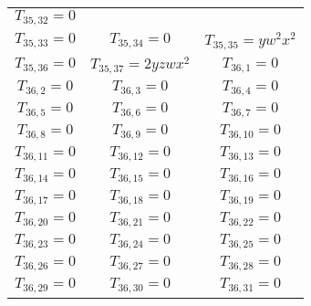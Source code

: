 \begin{longtable}{|c|c|c|}
$T_{35,32}= 0$\\

$T_{35,33}= 0$&

$T_{35,34}= 0$&

$T_{35,35}= yw^2x^2$\\

$T_{35,36}= 0$&

$T_{35,37}= 2yzwx^2$&

$T_{36,1}= 0$\\

$T_{36,2}= 0$&

$T_{36,3}= 0$&

$T_{36,4}= 0$\\

$T_{36,5}= 0$&

$T_{36,6}= 0$&

$T_{36,7}= 0$\\

$T_{36,8}= 0$&

$T_{36,9}= 0$&

$T_{36,10}= 0$\\

$T_{36,11}= 0$&

$T_{36,12}= 0$&

$T_{36,13}= 0$\\

$T_{36,14}= 0$&

$T_{36,15}= 0$&

$T_{36,16}= 0$\\

$T_{36,17}= 0$&

$T_{36,18}= 0$&

$T_{36,19}= 0$\\

$T_{36,20}= 0$&

$T_{36,21}= 0$&

$T_{36,22}= 0$\\

$T_{36,23}= 0$&

$T_{36,24}= 0$&

$T_{36,25}= 0$\\

$T_{36,26}= 0$&

$T_{36,27}= 0$&

$T_{36,28}= 0$\\

$T_{36,29}= 0$&

$T_{36,30}= 0$&

$T_{36,31}= 0$\\


\end{longtable}
